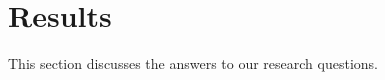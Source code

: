 \section{Results} \label{results}

This section discusses the answers to our research questions.





%
